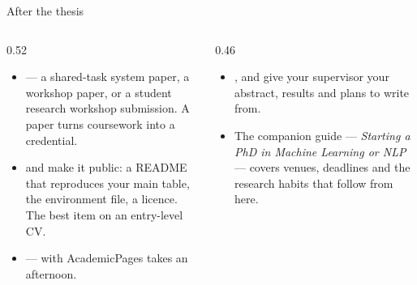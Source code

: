 \documentclass[aspectratio=169,11pt]{beamer}
\begin{document}
\begin{frame}{After the thesis}
\begin{columns}[T]
\begin{column}{0.52\textwidth}
\footnotesize
\begin{itemize}
  \item {} --- a shared-task system paper, a
        workshop paper, or a student research workshop submission. A paper
        turns coursework into a credential.
  \item {} and make it public: a README that
        reproduces your main table, the environment file, a licence. The best
        item on an entry-level CV.
  \item {} ---  with AcademicPages
        takes an afternoon.
\end{itemize}
\end{column}
\begin{column}{0.46\textwidth}
\footnotesize
\begin{itemize}
  \item {}, and give your
        supervisor your abstract, results and plans to write from.
  \item {} The companion guide --- \emph{Starting a PhD
        in Machine Learning or NLP} --- covers venues, deadlines and the
        research habits that follow from here.
\end{itemize}
\end{column}
\end{columns}
\end{frame}
\end{document}
